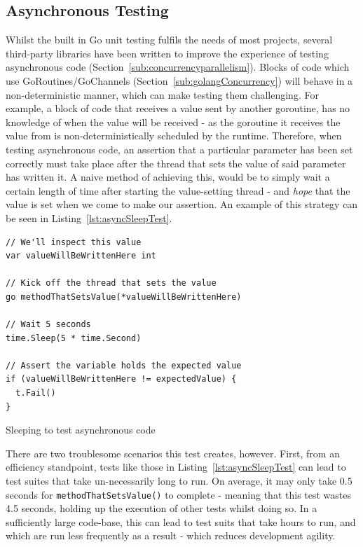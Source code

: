 \subsection{Asynchronous Testing}
\label{sub:asyncTesting}

Whilst the built in Go unit testing fulfils the needs of most projects, several
third-party libraries have been written to improve the experience of testing
asynchronous code (Section~\ref{sub:concurrencyparallelism}). Blocks of code
which use GoRoutines/GoChannels (Section~\ref{sub:golangConcurrency}) will
behave in a non-deterministic manner, which can make testing them challenging.
For example, a block of code that receives a value sent by another \gls{goroutine},
has no knowledge of when the value will be received - as the \gls{goroutine} it
receives the value from is non-deterministically scheduled by the runtime.
Therefore, when testing asynchronous code, an assertion that a particular
parameter has been set correctly must take place after the thread that sets the
value of said parameter has written it. A naive method of achieving this, would
be to simply wait a certain length of time after starting the value-setting
thread - and \emph{hope} that the value is set when we come to make our
assertion. An example of this strategy can be seen in
Listing~\ref{lst:asyncSleepTest}.

\begin{listing}[H]
  \centering
  \begin{verbatim}
// We'll inspect this value
var valueWillBeWrittenHere int

// Kick off the thread that sets the value
go methodThatSetsValue(*valueWillBeWrittenHere)

// Wait 5 seconds
time.Sleep(5 * time.Second)

// Assert the variable holds the expected value
if (valueWillBeWrittenHere != expectedValue) {
  t.Fail()
}
  \end{verbatim}
  \caption{Sleeping to test asynchronous code}
  \label{lst:asyncSleepTest}
\end{listing}

There are two troublesome scenarios this test creates, however. First, from an
efficiency standpoint, tests like those in Listing~\ref{lst:asyncSleepTest} can
lead to test suites that take un-necessarily long to run. On average, it may
only take 0.5 seconds for \texttt{methodThatSetsValue()} to complete -
meaning that this test wastes 4.5 seconds, holding up the execution of other
tests whilst doing so. In a sufficiently large code-base, this can lead to test
suits that take hours to run, and which are run less frequently as a result -
which reduces development agility.

